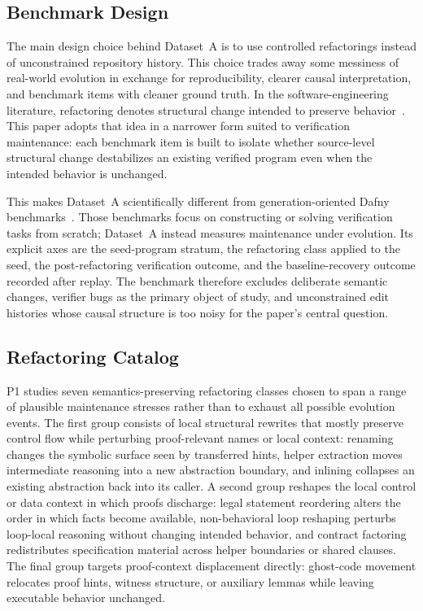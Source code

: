 \subsection{Benchmark Design}

The main design choice behind Dataset~A is to use controlled refactorings instead of unconstrained repository history. This choice trades away some messiness of real-world evolution in exchange for reproducibility, clearer causal interpretation, and benchmark items with cleaner ground truth. In the software-engineering literature, refactoring denotes structural change intended to preserve behavior~\cite{Mens2004RefactoringSurvey,Kim2012RefactoringInTheWild,Tsantalis2014RefactoringOperations}. This paper adopts that idea in a narrower form suited to verification maintenance: each benchmark item is built to isolate whether source-level structural change destabilizes an existing verified program even when the intended behavior is unchanged.

This makes Dataset~A scientifically different from generation-oriented Dafny benchmarks~\cite{DafnyBench2024,Xu2026DafnyComp,Wang2026TACoDafny}. Those benchmarks focus on constructing or solving verification tasks from scratch; Dataset~A instead measures maintenance under evolution. Its explicit axes are the seed-program stratum, the refactoring class applied to the seed, the post-refactoring verification outcome, and the baseline-recovery outcome recorded after replay. The benchmark therefore excludes deliberate semantic changes, verifier bugs as the primary object of study, and unconstrained edit histories whose causal structure is too noisy for the paper's central question.

\subsection{Refactoring Catalog}

P1 studies seven semantics-preserving refactoring classes chosen to span a range of plausible maintenance stresses rather than to exhaust all possible evolution events. The first group consists of local structural rewrites that mostly preserve control flow while perturbing proof-relevant names or local context: renaming changes the symbolic surface seen by transferred hints, helper extraction moves intermediate reasoning into a new abstraction boundary, and inlining collapses an existing abstraction back into its caller. A second group reshapes the local control or data context in which proofs discharge: legal statement reordering alters the order in which facts become available, non-behavioral loop reshaping perturbs loop-local reasoning without changing intended behavior, and contract factoring redistributes specification material across helper boundaries or shared clauses. The final group targets proof-context displacement directly: ghost-code movement relocates proof hints, witness structure, or auxiliary lemmas while leaving executable behavior unchanged.


